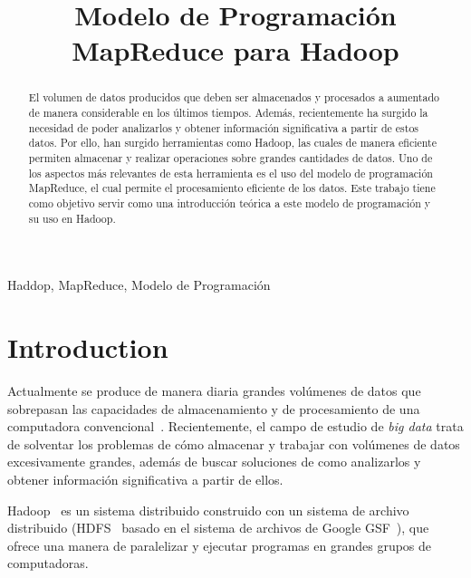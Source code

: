\documentclass[conference]{IEEEtran}
\begin{document}
\title{Modelo de Programación MapReduce para Hadoop}

\author{
}

\maketitle

\begin{abstract}
El volumen de datos producidos que deben ser almacenados y procesados a aumentado de manera considerable en los últimos tiempos.
Además, recientemente ha surgido la necesidad de poder analizarlos y obtener información significativa a partir de estos datos.
Por ello, han surgido herramientas como Hadoop, las cuales de manera eficiente permiten almacenar y realizar operaciones sobre grandes cantidades de datos.
Uno de los aspectos más relevantes de esta herramienta es el uso del modelo de programación MapReduce, el cual permite el procesamiento eficiente de los datos.
Este trabajo tiene como objetivo servir como una introducción teórica a este modelo de programación y su uso en Hadoop.
\end{abstract}



\begin{IEEEkeywords}
Haddop, MapReduce, Modelo de Programación
\end{IEEEkeywords}



\section{Introduction}
\label{intro}

Actualmente se produce de manera diaria grandes volúmenes de datos que sobrepasan las capacidades de almacenamiento y de procesamiento de una computadora convencional~\cite{Holmes12}.
Recientemente, el campo de estudio de \textit{big data} trata de solventar los problemas de cómo almacenar y trabajar con volúmenes de datos excesivamente grandes, además de buscar soluciones de como analizarlos y obtener información significativa a partir de ellos.


Hadoop~\cite{Hadoop} es un sistema distribuido construido con un sistema de archivo distribuido (HDFS~\cite{HDFS10} basado en el sistema de archivos de Google GSF~\cite{GoogleFS03}), que ofrece una manera de paralelizar y ejecutar programas en grandes grupos de computadoras.
\end{document}
